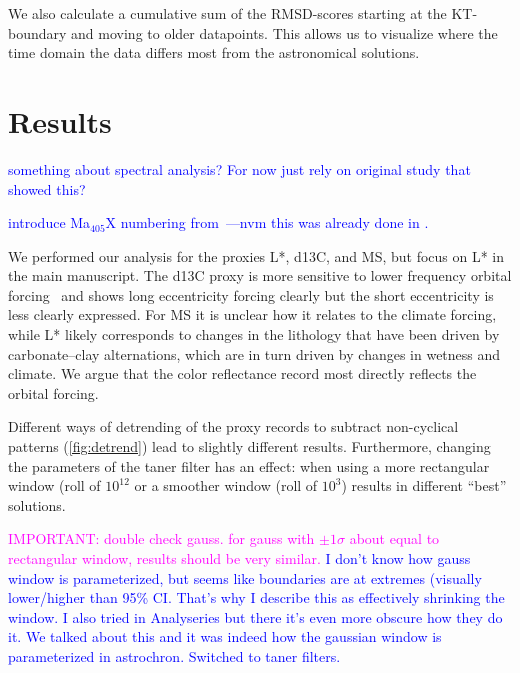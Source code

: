 \documentclass[draft]{agujournal2019}
\newcommand{\rez}{\textcolor{magenta}}
\newcommand{\ijk}{\textcolor{blue}}
\begin{document}
We also calculate a cumulative sum of the \gls{RMSD}-scores starting at the \gls{KT}-boundary and moving to older datapoints.
This allows us to visualize where the time domain the data differs most from the astronomical solutions.

\section{Results}\label{sec:results}

\ijk{something about spectral analysis? For now just rely on original study that showed this?}

\ijk{introduce Ma\(_{405}\)X numbering from~\cite{Husson2011}---nvm this was already done in .}

We performed our analysis for the proxies \gls{L*}, \gls{d13C}, and \gls{MS}, but  focus on \gls{L*} in the main manuscript.
The \gls{d13C} proxy is more sensitive to lower frequency orbital forcing~\cite{Zeebe2017,Kocken2019loscar} and shows long eccentricity forcing clearly but the short eccentricity is less clearly expressed.
For \gls{MS} it is unclear how it relates to the climate forcing, %
while \gls{L*} likely corresponds to changes in the lithology that have been driven by carbonate--clay alternations, which are in turn driven by changes in wetness and climate.
We argue that the color reflectance record most directly reflects the orbital forcing.

Different ways of detrending of the proxy records to subtract non-cyclical patterns (\cref{fig:detrend}) lead to slightly different results.
Furthermore, changing the parameters of the taner filter has an effect: when using a more rectangular window (roll of \(10^{12}\) or a smoother window (roll of \(10^{3}\)) results in different ``best'' solutions.

\rez{IMPORTANT: double check gauss. for gauss with $\pm 1 \sigma$ about equal to rectangular window, results should be very similar.}
\ijk{I don't know how gauss window is parameterized, but seems like boundaries are at extremes (visually lower/higher than 95\% CI. That's why I describe this as effectively shrinking the window. I also tried in Analyseries but there it's even more obscure how they do it.}
\ijk{We talked about this and it was indeed how the gaussian window is parameterized in astrochron. Switched to taner filters.}
\end{document}
